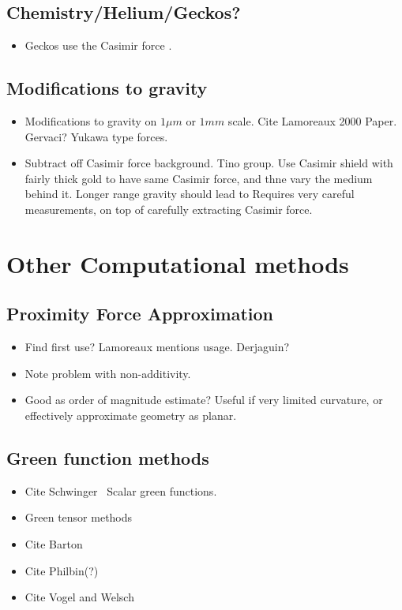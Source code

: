 \subsection{Chemistry/Helium/Geckos?}

\begin{itemize}
\item Geckos use the Casimir force \cite{Autumn2002}.
\end{itemize}

\subsection{Modifications to gravity}

\begin{itemize}
\item Modifications to gravity on $1\mu m$ or $1mm$ scale.  Cite Lamoreaux 2000 Paper.  Gervaci?
Yukawa type forces.  
\item Subtract off Casimir force background.  Tino group.  Use Casimir shield with fairly thick gold to have same Casimir force, and thne vary the medium behind it.  Longer range gravity should lead to 
Requires very careful measurements, on top of carefully extracting Casimir force.   
\end{itemize}

\section{Other Computational methods}

\subsection{Proximity Force Approximation}

\begin{itemize}
\item Find first use?  Lamoreaux mentions usage.  Derjaguin?
\item Note problem with non-additivity. 
\item Good as order of magnitude estimate?  Useful if very limited curvature, or effectively approximate geometry as planar.  
\end{itemize}

\subsection{Green function methods}

\begin{itemize}
\item Cite Schwinger~\cite{Schwinger1978, Milton1978}  Scalar green functions.  
\item Green tensor methods
\item Cite Barton
\item Cite Philbin(?)
\item Cite Vogel and Welsch
\end{itemize}

